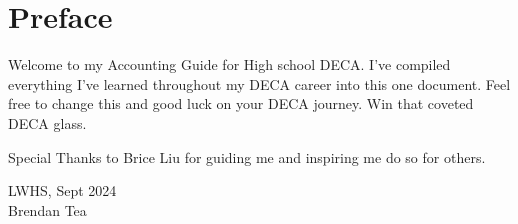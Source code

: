 \chapter*{Preface}
Welcome to my Accounting Guide for High school DECA.
I’ve compiled everything I’ve learned throughout my DECA career into this one document.
Feel free to change this and good luck on your DECA journey. 
Win that coveted DECA glass. 

Special Thanks to Brice Liu for guiding me 
and inspiring me do so for others.
\begin{flushright}
LWHS, Sept 2024 \\
Brendan Tea
\end{flushright}